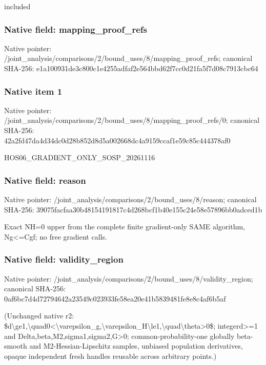 \documentclass[10pt,a4paper]{article}
\begin{document}
\begingroup\raggedright\sloppy included\par\endgroup

\subsubsection{Native field: mapping\_\allowbreak{}proof\_\allowbreak{}refs}
Native pointer: /joint\_\allowbreak{}analysis/comparisons/2/bound\_\allowbreak{}uses/8/mapping\_\allowbreak{}proof\_\allowbreak{}refs; canonical SHA-256: e1a100931de3c800c1e4255adfaf2e564bbd62f7cc0d21fa5f7d08c7913cbc64

\subsubsection{Native item 1}
Native pointer: /joint\_\allowbreak{}analysis/comparisons/2/bound\_\allowbreak{}uses/8/mapping\_\allowbreak{}proof\_\allowbreak{}refs/0; canonical SHA-256: 42a2fd47da4d34dc0d28b852d8d5a002668dc4a9159ccaf1e59c85c444378af0

\begingroup\raggedright\sloppy HOS06\_\allowbreak{}GRADIENT\_\allowbreak{}ONLY\_\allowbreak{}SOSP\_\allowbreak{}20261116\par\endgroup

\subsubsection{Native field: reason}
Native pointer: /joint\_\allowbreak{}analysis/comparisons/2/bound\_\allowbreak{}uses/8/reason; canonical SHA-256: 39075facfaa30b48154191817c4d268bcf1b40e155c24e58e57896bb0adced1b

\begingroup\raggedright\sloppy Exact NH=\allowbreak{}0 upper from the complete finite gradient-only SAME algorithm,\allowbreak{} Ng<=\allowbreak{}Cgf;\allowbreak{} no free gradient calls.\par\endgroup

\subsubsection{Native field: validity\_\allowbreak{}region}
Native pointer: /joint\_\allowbreak{}analysis/comparisons/2/bound\_\allowbreak{}uses/8/validity\_\allowbreak{}region; canonical SHA-256: 0af6bc7d4d72794642a23549c023933fe58ea20e41b5839481fe8e8c4af6b5af

\begingroup\raggedright\sloppy (Unchanged native r2:\allowbreak{} \$d\textbackslash{}ge1,\allowbreak{}\textbackslash{}quad0<\textbackslash{}varepsilon\_\allowbreak{}g,\allowbreak{}\textbackslash{}varepsilon\_\allowbreak{}H\textbackslash{}le1,\allowbreak{}\textbackslash{}quad\textbackslash{}theta>0\$;\allowbreak{} integerd>=\allowbreak{}1 and Delta,\allowbreak{}beta,\allowbreak{}M2,\allowbreak{}sigma1,\allowbreak{}sigma2,\allowbreak{}G>0;\allowbreak{} common-probability-one globally beta-smooth and M2-Hessian-Lipschitz samples,\allowbreak{} unbiased population derivatives,\allowbreak{} opaque independent fresh handles reusable across arbitrary points.)\par\endgroup
\end{document}
